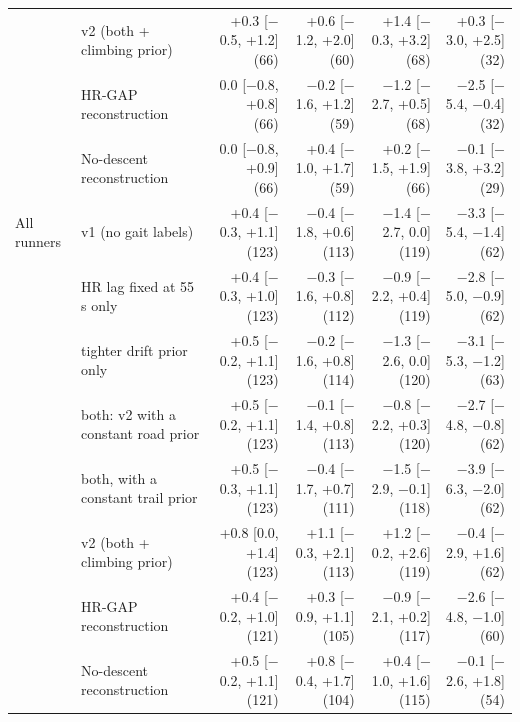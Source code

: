 \begin{tabular}{@{}llrrrr@{}}
 & \ascent{} v2 (both + climbing prior) & +0.3 [$-$0.5, +1.2] (66) & +0.6 [$-$1.2, +2.0] (60) & +1.4 [$-$0.3, +3.2] (68) & +0.3 [$-$3.0, +2.5] (32) \\
 & HR-GAP reconstruction & 0.0 [$-$0.8, +0.8] (66) & $-$0.2 [$-$1.6, +1.2] (59) & $-$1.2 [$-$2.7, +0.5] (68) & $-$2.5 [$-$5.4, $-$0.4] (32) \\
 & No-descent reconstruction & 0.0 [$-$0.8, +0.9] (66) & +0.4 [$-$1.0, +1.7] (59) & +0.2 [$-$1.5, +1.9] (66) & $-$0.1 [$-$3.8, +3.2] (29) \\
\addlinespace[2pt]
All runners & \ascent{} v1 (no gait labels) & +0.4 [$-$0.3, +1.1] (123) & $-$0.4 [$-$1.8, +0.6] (113) & $-$1.4 [$-$2.7, 0.0] (119) & $-$3.3 [$-$5.4, $-$1.4] (62) \\
 & \quad HR lag fixed at 55 s only & +0.4 [$-$0.3, +1.0] (123) & $-$0.3 [$-$1.6, +0.8] (112) & $-$0.9 [$-$2.2, +0.4] (119) & $-$2.8 [$-$5.0, $-$0.9] (62) \\
 & \quad tighter drift prior only & +0.5 [$-$0.2, +1.1] (123) & $-$0.2 [$-$1.6, +0.8] (114) & $-$1.3 [$-$2.6, 0.0] (120) & $-$3.1 [$-$5.3, $-$1.2] (63) \\
 & \quad both: v2 with a constant road prior & +0.5 [$-$0.2, +1.1] (123) & $-$0.1 [$-$1.4, +0.8] (113) & $-$0.8 [$-$2.2, +0.3] (120) & $-$2.7 [$-$4.8, $-$0.8] (62) \\
 & \quad both, with a constant trail prior & +0.5 [$-$0.3, +1.1] (123) & $-$0.4 [$-$1.7, +0.7] (111) & $-$1.5 [$-$2.9, $-$0.1] (118) & $-$3.9 [$-$6.3, $-$2.0] (62) \\
 & \ascent{} v2 (both + climbing prior) & +0.8 [0.0, +1.4] (123) & +1.1 [$-$0.3, +2.1] (113) & +1.2 [$-$0.2, +2.6] (119) & $-$0.4 [$-$2.9, +1.6] (62) \\
 & HR-GAP reconstruction & +0.4 [$-$0.2, +1.0] (121) & +0.3 [$-$0.9, +1.1] (105) & $-$0.9 [$-$2.1, +0.2] (117) & $-$2.6 [$-$4.8, $-$1.0] (60) \\
 & No-descent reconstruction & +0.5 [$-$0.2, +1.1] (121) & +0.8 [$-$0.4, +1.7] (104) & +0.4 [$-$1.0, +1.6] (115) & $-$0.1 [$-$2.6, +1.8] (54) \\
\bottomrule
\end{tabular}
